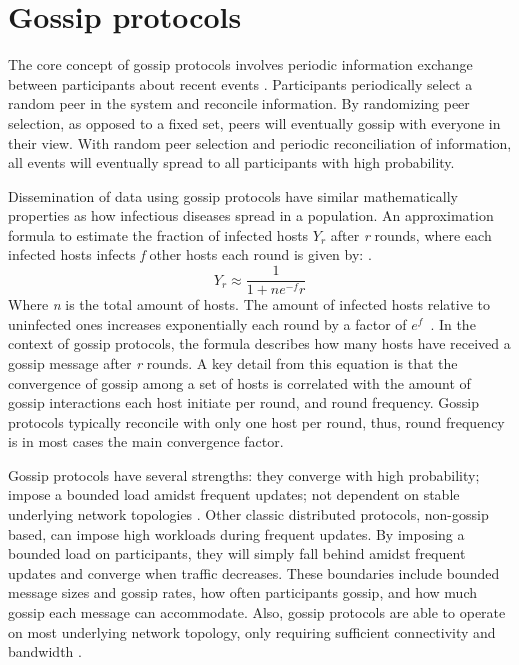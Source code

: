 \documentclass[USenglish]{uit-thesis}
\begin{document}
\section{Gossip protocols}
The core concept of gossip protocols involves periodic information exchange between participants about recent events \cite{epidemic}.
Participants periodically select a random peer in the system and reconcile information.
By randomizing peer selection, as opposed to a fixed set, peers will eventually gossip with everyone in their view.
With random peer selection and periodic reconciliation of information, all events will eventually spread to all participants with high probability.

Dissemination of data using gossip protocols have similar mathematically properties as how infectious diseases spread in a population. 
An approximation formula to estimate the fraction of infected hosts $Y_r$ after \textit{r} rounds, where each infected hosts infects \textit{f} other hosts each round is given by: \cite{epidemic, infect_math}.
\begin{equation}
Y_r \approx \frac{1}{1 + n e^{-f} r}
\end{equation}
Where \textit{n} is the total amount of hosts.
The amount of infected hosts relative to uninfected ones increases exponentially each round by a factor of $e^f$~\cite{epidemic}.
In the context of gossip protocols, the formula describes how many hosts have received a gossip message after \textit{r} rounds.
A key detail from this equation is that the convergence of gossip among a set of hosts is correlated with the amount of gossip interactions each host initiate per round, and round frequency.
Gossip protocols typically reconcile with only one host per round, thus, round frequency is in most cases the main convergence factor.  


Gossip protocols have several strengths: they converge with high probability; impose a bounded load amidst frequent updates; not dependent on stable underlying network topologies \cite{gossip_promise}.
Other classic distributed protocols, non-gossip based, can impose high workloads during frequent updates.
By imposing a bounded load on participants, they will simply fall behind amidst frequent updates and converge when traffic decreases.
These boundaries include bounded message sizes and gossip rates, how often participants gossip, and how much gossip each message can accommodate. 
Also, gossip protocols are able to operate on most underlying network topology, only requiring sufficient connectivity and bandwidth \cite{gossip_promise}.
 
\end{document}
